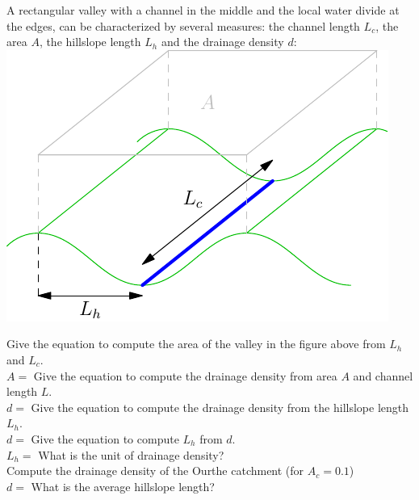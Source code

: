 \documentclass[twocolumn, 10pt, a4paper]{article}
\newenvironment{PC_prac_environment}{
\def\Q{\noindent \color{Gray}\rule[-0.1cm]{\columnwidth}{1.5pt}  \color{black} } \let\ques\Q 
\def\nQ{\noindent \color{black} } \let\ques\nQ 
\def\E{\color{Gray}\rule[0.3cm]{\columnwidth}{1.5pt} \color{black}} \let\ques\E }
\newcommand{\A}[2] { \ifthenelse{\boolean{showanswer}} {\noindent \color{cyan}{#2}\color{black}} {\multido{}{#1}{\noindent \color{light-gray}\hrulefill\\} } }
\begin{document}
\begin{PC_prac_environment}
A rectangular valley with a channel in the middle and the local water divide at the edges, can be characterized by several measures: the channel length $L_c$, the area $A$, the hillslope length $L_h$ and the drainage density $d$:\\

\includegraphics[width=0.75\columnwidth]{hillslope.pdf}\\\vspace{2mm}

\nQ Give the equation to compute the area of the valley in the figure above from $L_h$ and $L_c$.\\
$A=$
\nQ Give the equation to compute the drainage density from area $A$ and channel length $L$.\\
$d=$
\nQ Give the equation to compute the drainage density from the hillslope length $L_h$.\\
$d=$
\nQ Give the equation to compute $L_h$ from $d$.\\
$L_h=$
\nQ  What is the unit of drainage density?\\
\nQ Compute the drainage density of the Ourthe catchment (for $A_c=0.1$)\\
$d=$
\nQ What is the average hillslope length?\\
\E 


\end{PC_prac_environment}
\end{document}

